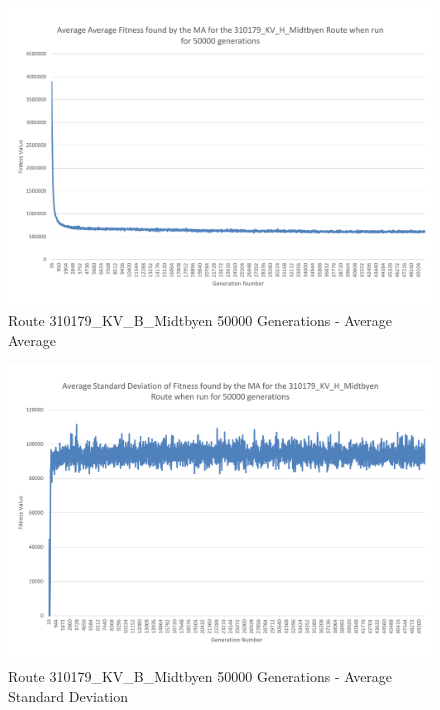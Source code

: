 \begin{landscape}
\begin{figure}[thbp]
	\centerline{\includegraphics[height=0.945\textwidth]{figures/Trondheim_graphs/KV_H/KV_H-all_average_average.pdf}}
	\caption{Route 310179\_KV\_B\_Midtbyen 50000 Generations - Average Average}
	\label{fig:KV_H_50k_aa}
\end{figure}
\end{landscape}

\begin{landscape}
\begin{figure}[thbp]
	\centerline{\includegraphics[height=0.945\textwidth]{figures/Trondheim_graphs/KV_H/KV_H-all_average_standard_deviation.pdf}}
	\caption{Route 310179\_KV\_B\_Midtbyen 50000 Generations - Average Standard Deviation}
	\label{fig:KV_H_50k_astd}
\end{figure}
\end{landscape}

